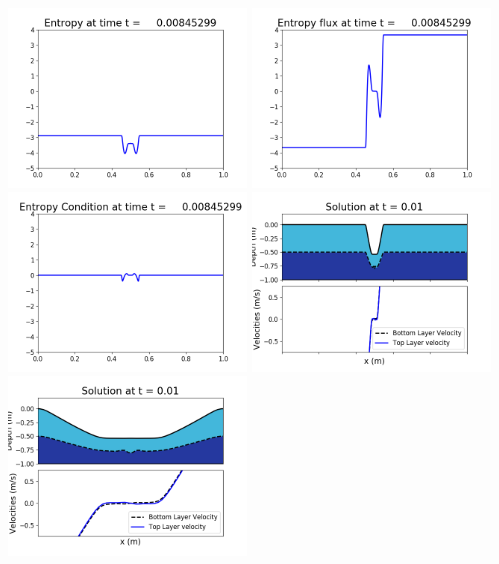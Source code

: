 \documentclass[11pt]{article}
\begin{document}
\vskip 10pt 
\includegraphics[width=0.475\textwidth]{frame0025fig1007.png}
\includegraphics[width=0.475\textwidth]{frame0025fig1008.png}
\vskip 10pt 
\includegraphics[width=0.475\textwidth]{frame0025fig1009.png}
\vskip 10pt 
\includegraphics[width=0.475\textwidth]{frame0026fig1001.png}
\includegraphics[width=0.475\textwidth]{frame0026fig1002.png}
\end{document}
